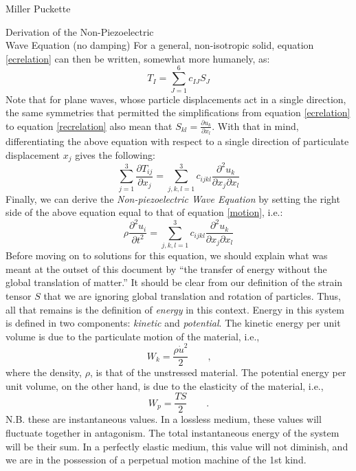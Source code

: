 \documentclass[a4paper,10pt]{report}
\numberwithin{equation}{section}
\begin{document}
\begin{chapter}{Miller Puckette}
\begin{section}{Derivation of the Non-Piezoelectric \\ Wave Equation (no damping)}
For a general, non-isotropic solid, equation \eqref{ecrelation} can then be written, somewhat more humanely, as:
\begin{equation}\label{recrelation}
 T_{I} = \sum_{J=1}^{6} c_{IJ} S_{J}
\end{equation}
Note that for plane waves, whose particle displacements act in a single direction, the same symmetries that permitted the simplifications from equation \eqref{ecrelation} to equation \eqref{recrelation} also mean that $S_{kl} =\frac{\partial u_k}{\partial x_l}$. With that in mind, differentiating the above equation with respect to a single direction of particulate displacement $x_j$ gives the following\cite{Ballantine1997}:
\begin{equation}
 \sum_{j=1}^3 \frac{\partial T_{ij}}{\partial x_{j}} = \sum_{j,k,l=1}^3 c_{ijkl}\frac{\partial^2 u_k}{\partial x_j \partial x_l}
\end{equation}
Finally, we can derive the \emph{Non-piezoelectric Wave Equation} by setting the right side of the above equation equal to that of equation \eqref{motion}, i.e.:
\begin{equation}\label{npwaveq}
 \rho\frac{\partial^2u_i}{\partial t^2} = \sum_{j,k,l=1}^3 c_{ijkl} \frac{\partial^2 u_k}{\partial x_j \partial x_l}
\end{equation}
Before moving on to solutions for this equation, we should explain what was meant at the outset of this document by ``the transfer of energy without the global translation of matter.'' It should be clear from our definition of the strain tensor $S$ that we are ignoring global translation and rotation of particles. Thus, all that remains is the definition of \emph{energy} in this context. Energy in this system is defined in two components: \emph{kinetic} and \emph{potential}. The kinetic energy per unit volume is due to the particulate motion of the material, i.e.\cite[p.~6]{Kino1987},
\begin{equation}\label{kinetic}
W_k = \frac{\rho \dot{u}^2}{2}\qquad \text{,}
\end{equation}
where the density, $\rho$, is that of the unstressed material. The potential energy per unit volume, on the other hand, is due to the elasticity of the material, i.e., \cite[p.~6]{Kino1987}
\begin{equation}\label{potential}
 W_p = \frac{TS}{2}\qquad \text{.}
\end{equation}
N.B. these are instantaneous values. In a lossless medium, these values will fluctuate together in antagonism. The total instantaneous energy of the system will be their sum. In a perfectly elastic medium, this value will not diminish, and we are in the possession of a perpetual motion machine of the 1st kind.
\end{section}


\end{chapter}
\end{document}
